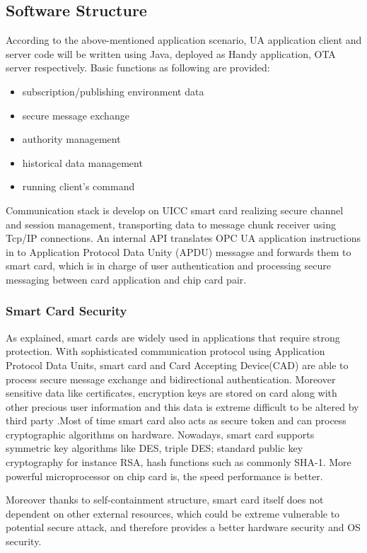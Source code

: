 \documentclass[]{llncs}
\begin{document}
\subsection {Software Structure}
According to the above-mentioned application scenario, UA application client and server code will be written using Java, deployed as Handy application, OTA server respectively. 
Basic functions as following are provided:
 \begin{itemize}
  \item subscription/publishing environment data
  \item secure message exchange
  \item authority management
  \item historical data management
  \item running client's command
\end{itemize}
Communication stack is develop on UICC smart card realizing secure channel and session management, transporting data to message chunk receiver using Tcp/IP connections. An internal API translates OPC UA application instructions in to Application Protocol Data Unity (APDU) messagse and forwards them to smart card, which is in charge of user authentication and processing secure messaging between card application and chip card pair. 
\subsubsection{Smart Card Security}
As explained, smart cards are widely used in applications that require strong protection. With sophisticated communication protocol using Application Protocol Data Units, smart card and Card Accepting Device(CAD) are able to process secure message exchange and bidirectional authentication. Moreover sensitive data like certificates, encryption keys are stored on card along with other precious user information and this data is extreme difficult to be altered by third party .Most of time smart card also acts as secure token and can process cryptographic algorithms on hardware. Nowadays, smart card supports symmetric key algorithms like DES, triple DES; standard public key cryptography for instance RSA, hash functions such as commonly SHA-1\cite{handbuch}. More powerful microprocessor on chip card is, the speed performance is better.  

Moreover thanks to self-containment structure, smart card itself does not dependent on other external resources, which could be extreme vulnerable to potential secure attack, and therefore provides a better hardware security and OS security.
\end{document}
